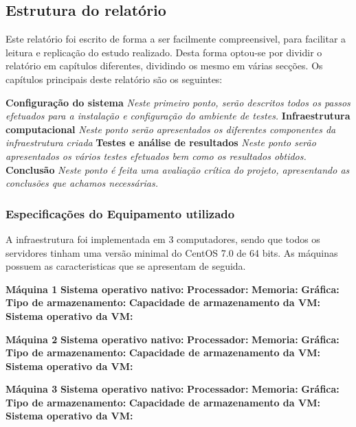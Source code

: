 \subsection{Estrutura do relatório}
Este relatório foi escrito de forma a ser facilmente compreensivel, para facilitar a leitura e replicação do estudo realizado.
Desta forma optou-se por dividir o relatório em capítulos diferentes, dividindo os mesmo em várias secções. Os capítulos principais deste relatório são os seguintes:

\textbf{Configuração do sistema} \textit{Neste primeiro ponto, serão descritos todos os passos efetuados para a instalação e configuração do ambiente de testes.}
\textbf{Infraestrutura computacional} \textit{Neste ponto serão apresentados os diferentes componentes da infraestrutura criada}
\textbf{Testes e análise de resultados} \textit{Neste ponto serão apresentados os vários testes efetuados bem como os resultados obtidos.}
\textbf{Conclusão} \textit{Neste ponto é feita uma avaliação crítica do projeto, apresentando as conclusões que achamos necessárias.}

\subsubsection{Especificações do Equipamento utilizado}
A infraestrutura foi implementada em 3 computadores, sendo que todos os servidores tinham uma versão minimal do CentOS 7.0 de 64 bits. As máquinas possuem as caracteristicas que se apresentam de seguida.

\textbf{Máquina 1}
\textbf{Sistema operativo nativo:} \textit{}
\textbf{Processador:} \textit{}
\textbf{Memoria:} \textit{}
\textbf{Gráfica:} \textit{}
\textbf{Tipo de armazenamento:} \textit{}
\textbf{Capacidade de armazenamento da VM:} \textit{}
\textbf{Sistema operativo da VM:} \textit{}

\textbf{Máquina 2}
\textbf{Sistema operativo nativo:} \textit{}
\textbf{Processador:} \textit{}
\textbf{Memoria:} \textit{}
\textbf{Gráfica:} \textit{}
\textbf{Tipo de armazenamento:} \textit{}
\textbf{Capacidade de armazenamento da VM:} \textit{}
\textbf{Sistema operativo da VM:} \textit{}

\textbf{Máquina 3}
\textbf{Sistema operativo nativo:} \textit{}
\textbf{Processador:} \textit{}
\textbf{Memoria:} \textit{}
\textbf{Gráfica:} \textit{}
\textbf{Tipo de armazenamento:} \textit{}
\textbf{Capacidade de armazenamento da VM:} \textit{}
\textbf{Sistema operativo da VM:} \textit{}
